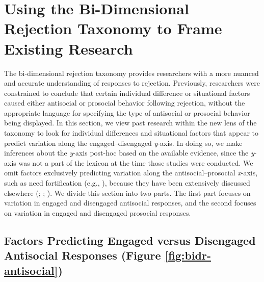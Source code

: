 \documentclass[
]{udthesis}
\begin{document}
\section{Using the Bi-Dimensional Rejection Taxonomy to Frame Existing Research}\label{using-the-bi-dimensional-rejection-taxonomy-to-frame-existing-research}

The bi-dimensional rejection taxonomy provides researchers with a more
nuanced and accurate understanding of responses to rejection.
Previously, researchers were constrained to conclude that certain
individual difference or situational factors caused either antisocial or
prosocial behavior following rejection, without the appropriate language
for specifying the type of antisocial or prosocial behavior being
displayed. In this section, we view past research within the new lens of
the taxonomy to look for individual differences and situational factors
that appear to predict variation along the engaged--disengaged \emph{y}-axis.
In doing so, we make inferences about the \emph{y}-axis post-hoc based on the
available evidence, since the \emph{y}-axis was not a part of the lexicon at
the time those studies were conducted. We omit factors exclusively
predicting variation along the antisocial--prosocial \emph{x}-axis, such as
need fortification (e.g., ),
because they have been extensively discussed elsewhere
(; ; ). We divide this section into
two parts. The first part focuses on variation in engaged and disengaged
antisocial responses, and the second focuses on variation in engaged and
disengaged prosocial responses.

\subsection{Factors Predicting Engaged versus Disengaged Antisocial Responses (Figure \ref{fig:bidr-antisocial})}\label{factors-predicting-engaged-versus-disengaged-antisocial-responses-figure-reffigbidr-antisocial}
\end{document}
